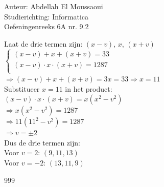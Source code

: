 \documentclass[a4paper]{article}
\begin{document}
  
\noindent \large Auteur: Abdellah El Moussaoui \\
\noindent \large Studierichting: Informatica\\
\noindent \large Oefeningenreeks 6A nr. 9.2\\

\medskip

\normalsize

Laat de drie termen zijn: $(x - v)$, $x$, $(x + v)$\\

$\left\{
\begin{array}{l}
(x - v) + x + (x + v) = 33\\
(x - v) \cdot x \cdot (x + v) = 1287\\
\end{array}
\right.$\\

$\Rightarrow (x - v) + x + (x + v) = 3x = 33 \Rightarrow x = 11$\\

Substitueer $x = 11$ in het product:\\

$(x - v) \cdot x \cdot (x + v) = x(x^2 - v^2)$\\

$\Rightarrow x(x^2 - v^2) = 1287$\\

$\Rightarrow 11(11^2 - v^2) = 1287$\\

$\Rightarrow v = \pm2$\\

Dus de drie termen zijn:\\

Voor $v = 2$: $(9,11,13)$\\

Voor $v = -2$: $(13,11,9)$\\

\begin{thebibliography}{999}
\end{thebibliography}
\end{document}
